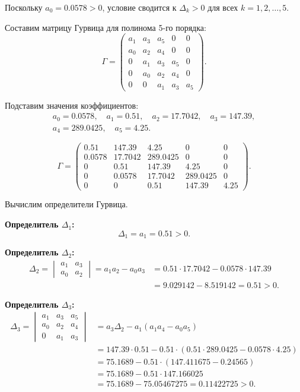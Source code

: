 Поскольку $a_0 = 0.0578 > 0$, условие сводится к $\Delta_k > 0$ для всех $k = 1, 2, \ldots, 5$.

Составим матрицу Гурвица для полинома 5-го порядка:
\[
\Gamma = \begin{pmatrix}
a_1 & a_3 & a_5 & 0 & 0 \\
a_0 & a_2 & a_4 & 0 & 0 \\
0 & a_1 & a_3 & a_5 & 0 \\
0 & a_0 & a_2 & a_4 & 0 \\
0 & 0 & a_1 & a_3 & a_5
\end{pmatrix}.
\]

Подставим значения коэффициентов:
\begin{gather*}
  a_0 = 0.0578, \quad a_1 = 0.51, \quad a_2 = 17.7042, \quad a_3 = 147.39, \\
  a_4 = 289.0425, \quad a_5 = 4.25.
\end{gather*}


\[
\Gamma = \begin{pmatrix}
0.51 & 147.39 & 4.25 & 0 & 0 \\
0.0578 & 17.7042 & 289.0425 & 0 & 0 \\
0 & 0.51 & 147.39 & 4.25 & 0 \\
0 & 0.0578 & 17.7042 & 289.0425 & 0 \\
0 & 0 & 0.51 & 147.39 & 4.25
\end{pmatrix}.
\]

Вычислим определители Гурвица.

\textbf{Определитель $\Delta_1$:}
\[
\Delta_1 = a_1 = 0.51 > 0.
\]

\textbf{Определитель $\Delta_2$:}
\begin{align*}
  \Delta_2 = \begin{vmatrix}
  a_1 & a_3 \\
  a_0 & a_2
  \end{vmatrix} = a_1 a_2 - a_0 a_3 &= 0.51 \cdot 17.7042 - 0.0578 \cdot 147.39 \\
                                    &= 9.029142 - 8.519142 = 0.51 > 0.
\end{align*}

\textbf{Определитель $\Delta_3$:}
\begin{align*}
\Delta_3 = \begin{vmatrix}
a_1 & a_3 & a_5 \\
a_0 & a_2 & a_4 \\
0 & a_1 & a_3
\end{vmatrix} &= a_3 \Delta_2 - a_1 (a_1 a_4 - a_0 a_5) \\
&= 147.39 \cdot 0.51 - 0.51 \cdot (0.51 \cdot 289.0425 - 0.0578 \cdot 4.25) \\
&= 75.1689 - 0.51 \cdot (147.411675 - 0.24565) \\
&= 75.1689 - 0.51 \cdot 147.166025 \\
&= 75.1689 - 75.05467275 = 0.11422725 > 0.
\end{align*}

